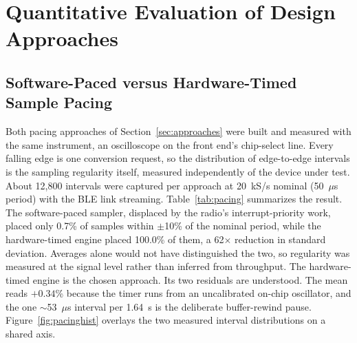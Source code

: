 \documentclass[11pt]{article}
\begin{document}
\section{Quantitative Evaluation of Design Approaches}\label{sec:quant}

\subsection{Software-Paced versus Hardware-Timed Sample Pacing}
Both pacing approaches of Section~\ref{sec:approaches} were built and measured with the same
instrument, an oscilloscope on the front end's chip-select line. Every falling edge is one
conversion request, so the distribution of edge-to-edge intervals is the sampling regularity
itself, measured independently of the device under test. About
12{,}800 intervals were captured per approach at 20~kS/s nominal (50~$\mu$s period) with
the BLE link streaming. Table~\ref{tab:pacing}
summarizes the result. The software-paced sampler, displaced by the radio's
interrupt-priority work, placed only 0.7\% of samples within $\pm$10\% of the nominal
period, while the hardware-timed engine placed 100.0\% of them, a 62$\times$ reduction
in standard deviation. Averages alone would not have distinguished the two, so regularity was measured at the
signal level rather than inferred from throughput. The hardware-timed engine is the chosen
approach. Its two residuals are understood. The mean reads $+0.34$\% because the timer runs
from an uncalibrated on-chip oscillator, and the one $\sim$53~$\mu$s interval per 1.64~s is
the deliberate buffer-rewind pause. Figure~\ref{fig:pacinghist} overlays the
two measured interval distributions on a shared axis.
\end{document}
